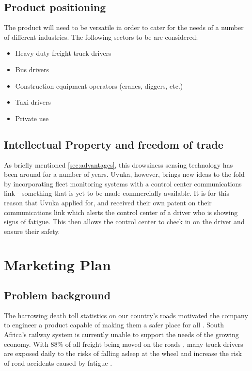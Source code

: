 \section{Product positioning}
The product will need to be versatile in order to cater for the needs of a number of different industries. The following sectors to be are considered:
\begin{itemize}
\item Heavy duty freight truck drivers
\item Bus drivers
\item Construction equipment operators (cranes, diggers, etc.)
\item Taxi drivers
\item Private use
\end{itemize}

\section{Intellectual Property and freedom of trade}

As briefly mentioned \cref{sec:advantages}, this drowsiness sensing technology has been around for a number of years. Uvuka, however, brings new ideas to the fold by incorporating fleet monitoring systems with a control center communications link - something that is yet to be made commercially available. It is for this reason that Uvuka applied for, and received their own patent on their communications link which alerts the control center of a driver who is showing signs of fatigue. This then allows the control center to check in on the driver and ensure their safety.

\newpage
\chapter{Marketing Plan}
\section{Problem background}
The harrowing death toll statistics on our country's roads motivated the company to engineer a product capable of making them a safer place for all \cite{EWNRoadDeaths}. South Africa's railway system is currently unable to support the needs of the growing economy. With 88\% of all freight being moved on the roads \cite{BDlive_freight}, many truck drivers are exposed daily to the risks of falling asleep at the wheel \cite{ArriveAliveDriverTiredness} and increase the risk of road accidents caused by fatigue \cite{News24TruckersSleeping}.

